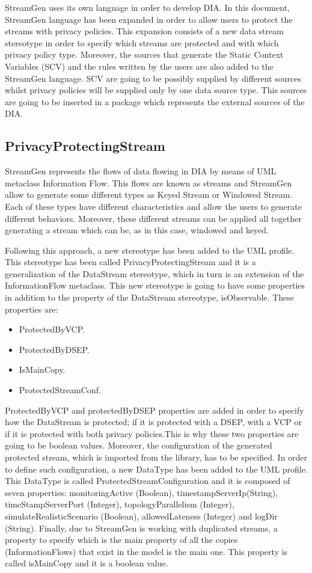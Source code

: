 StreamGen uses its own language in order to develop DIA. In this document, StreamGen language has been expanded in order to allow users to protect the streams with privacy policies. This expansion consists of a new data stream stereotype in order to specify which streams are protected and with which privacy policy type. Moreover, the sources that generate the Static Context Variables (SCV) and the rules written by the users are also added to the StreamGen language. SCV are going to be possibly supplied by different sources whilst privacy policies will be supplied only by one data source type. This sources are going to be inserted in a package which represents the external sources of the DIA.

\subsection{PrivacyProtectingStream}

StreamGen represents the flows of data flowing in DIA by means of UML metaclass Information Flow. This flows are known as streams and StreamGen allow to generate some different types as Keyed Stream or Windowed Stream. Each of these types have different characteristics and allow the users to generate different behaviors. Moreover, these different streams can be applied all together generating a stream which can be, as in this case, windowed and keyed.

Following this approach, a new stereotype has been added to the UML profile. This stereotype has been called PrivacyProtectingStream and it is a generalization of the DataStream stereotype, which in turn is an extension of the InformationFlow metaclass. This new stereotype is going to have some properties in addition to the property of the DataStream stereotype, isObservable. These properties are:

\begin{itemize}
\item ProtectedByVCP.
\item ProtectedByDSEP.
\item IsMainCopy.
\item ProtectedStreamConf.
\end{itemize}

ProtectedByVCP and protectedByDSEP properties are added in order to specify how the DataStream is protected; if it is protected with a DSEP, with a VCP or if it is protected with both privacy policies.This is why these two properties are going to be boolean values. Moreover, the configuration of the generated protected stream, which is imported from the library, has to be specified. In order to define such configuration, a new DataType has been added to the UML profile. This DataType is called ProtectedStreamConfiguration and it is composed of seven properties: monitoringActive (Boolean), timestampServerIp(String), timeStampServerPort (Integer), topologyParallelism (Integer), simulateRealisticScenario (Boolean), allowedLateness (Integer) and logDir (String). Finally, due to StreamGen is working with duplicated streams, a property to specify which is the main property of all the copies (InformationFlows) that exist in the model is the main one. This property is called isMainCopy and it is a boolean value.

